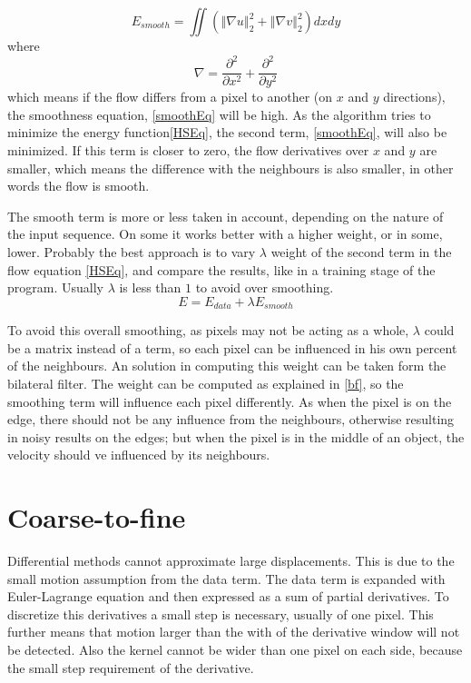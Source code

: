 \documentclass[12pt,a4paper,twoside]{report}
\begin{document}
\begin{equation} \label{smoothEq}
	E_{smooth} = \iint (\left\Vert\nabla u \right\Vert_2^2 +\left\Vert\nabla v \right\Vert_2^2)dxdy
\end{equation}
where
\begin{equation} \label{mynabla}
	\nabla = \frac{\partial^2}{\partial x^2} + \frac{\partial^2}{\partial y^2}
\end{equation}
which means if the flow differs from a pixel to another (on $x$ and $y$ directions), the smoothness equation, \ref{smoothEq} will be high. As the algorithm tries to minimize the energy function\ref{HSEq}, the second term, \ref{smoothEq}, will also be minimized. If this term is closer to zero, the flow derivatives over $x$ and $y$  are smaller, which means the difference with the  neighbours is also smaller, in other words the flow is smooth.

The smooth term is more or less taken in account, depending on the nature of the input sequence. On some it works better with a higher weight, or in some, lower. Probably the best approach is to vary $\lambda$ weight of the second term in the flow equation \ref{HSEq}, and compare the results, like in a training stage of the program. Usually $\lambda$ is less than $1$ to avoid over smoothing.
\begin{equation}
	E = E_{data}+\lambda E_{smooth}
\end{equation}

To avoid this overall smoothing, as pixels may not be acting as a whole, $\lambda$ could be a matrix instead of a term, so each pixel can be influenced in his own percent of the neighbours.
An solution in computing this weight can be taken form the bilateral filter. The weight can be computed as explained in
\ref{bf}, so the smoothing term will influence each pixel differently. As when the pixel is on the edge, there should not be any influence from the neighbours, otherwise resulting in noisy results on the edges; but when the pixel is in the middle of an object, the velocity should ve influenced by its neighbours.

\section{Coarse-to-fine}
Differential methods cannot approximate large displacements. This is due to the small motion assumption from the data term.
The data term is expanded with Euler-Lagrange equation and then expressed as a sum of partial derivatives. To discretize this derivatives a small step is necessary, usually of one pixel. This further means that motion larger than the with of the derivative window will not be detected. Also the kernel cannot be wider than one pixel on each side, because the small step requirement of the derivative.
\end{document}
